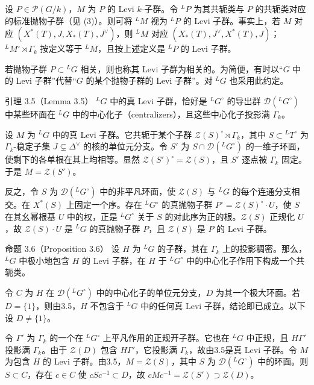 设 $P\in\mathcal P(G/k)$，$M$ 为 $P$ 的 Levi $k$-子群。令 ${}^LP$ 为其共轭类与 $P$ 的共轭类对应的标准抛物子群（见 (3)）。则可将 ${}^LM$ 视为 ${}^LP$ 的 Levi 子群。事实上，若 $M$ 对应 $(X^*(T),J,X_*(T),J^\vee)$，则 ${}^LM$ 对应 $(X_*(T),J^\vee,X^*(T),J)$；${}^LM^\circ\rtimes\Gamma_k$ 按定义等于 ${}^LM$，且按上述定义是 ${}^LP$ 的 Levi 子群。

若抛物子群 $P\subset{}^LG$ 相关，则也称其 Levi 子群为相关的。为简便，有时以“$G$ 中的 Levi 子群”代替“$G$ 的某个抛物子群的 Levi 子群”。对 ${}^LG$ 也采用此约定。

\begin{originaltheorem}{引理 3.5（Lemma 3.5）}
${}^LG$ 中的真 Levi 子群，恰好是 ${}^L G^\circ$ 的导出群 $\mathcal D({}^LG^\circ)$ 中某些环面在 ${}^LG$ 中的中心化子（centralizers），且这些中心化子投影满 $\Gamma_k$。
\end{originaltheorem}
设 $M$ 为 ${}^LG$ 中的真 Levi 子群。它共轭于某个子群 $\mathcal Z(S)^\circ\rtimes\Gamma_k$，其中 $S\subset{}^LT^\circ$ 为 $\Gamma_k$-稳定子集 $J\subsetneq\Delta^\vee$ 的核的单位元分支。令 $S'$ 为 $S\cap\mathcal D({}^LG^\circ)$ 的一维子环面，使剩下的各单根在其上均相等。显然 $\mathcal Z(S')^\circ=\mathcal Z(S)$，且 $S'$ 逐点被 $\Gamma_k$ 固定。于是 $M=\mathcal Z(S')$。

反之，令 $S$ 为 $\mathcal D({}^LG^\circ)$ 中的非平凡环面，使 $\mathcal Z(S)$ 与 ${}^LG$ 的每个连通分支相交。在 $X^*(S)$ 上固定一个序。存在 ${}^LG^\circ$ 的真抛物子群 $P^\circ=\mathcal Z(S)^\circ\cdot U$，使 $S$ 在其幺幂根基 $U$ 中的权，正是 ${}^LG^\circ$ 关于 $S$ 的对此序为正的根。$\mathcal Z(S)$ 正规化 $U$，故 $\mathcal Z(S)\cdot U$ 是 ${}^LG$ 的真抛物子群 $P$，且 $\mathcal Z(S)$ 是 $P$ 的 Levi 子群。

\begin{originaltheorem}{命题 3.6（Proposition 3.6）}
设 $H$ 为 ${}^LG$ 的子群，其在 $\Gamma_k$ 上的投影稠密。那么，${}^LG$ 中极小地包含 $H$ 的 Levi 子群，在 $H$ 于 ${}^LG^\circ$ 中的中心化子作用下构成一个共轭类。
\end{originaltheorem}
令 $C$ 为 $H$ 在 $\mathcal D({}^LG^\circ)$ 中的中心化子的单位元分支，$D$ 为其一个极大环面。若 $D=\{1\}$，则由3.5，$H$ 不包含于 ${}^LG$ 中的任何真 Levi 子群，结论即已成立。以下设 $D\neq\{1\}$。

令 $\Gamma'$ 为 $\Gamma_k$ 的一个在 ${}^LG^\circ$ 上平凡作用的正规开子群。它也在 ${}^LG$ 中正规，且 $H\Gamma'$ 投影满 $\Gamma_k$。由于 $\mathcal Z(D)$ 包含 $H\Gamma'$，它投影满 $\Gamma_k$，故由3.5是真 Levi 子群。令 $M$ 为包含 $H$ 的 Levi 子群。由3.5，$M=\mathcal Z(S)$，其中 $S$ 为 $\mathcal D({}^LG^\circ)$ 中的环面。则 $S\subset C$，存在 $c\in C$ 使 $cSc^{-1}\subset D$，故 $cMc^{-1}=\mathcal Z(S')\supset\mathcal Z(D)$。

